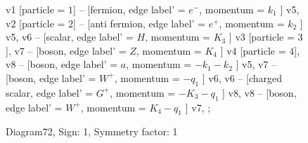 \documentclass{revtex4}
\begin{document}
\begin{figure}[!htb]
\begin{center}
{    %
v1 [particle = \(1\)] -- [fermion, edge label' = \(e^{-}\), momentum = \(k_{1}\) ] v5, 
v2 [particle = \(2\)] -- [anti fermion, edge label' = \(e^{+}\), momentum = \(k_{2}\) ] v5, 
v6 -- [scalar, edge label' = \(H\), momentum = \(K_{3}\) ] v3 [particle = \(3\)], 
v7 -- [boson, edge label' = \(Z\), momentum = \(K_{4}\) ] v4 [particle = \(4\)], 
v8 -- [boson, edge label' = \(a\), momentum = \(-k_{1} - k_{2}\) ] v5, 
v7 -- [boson, edge label' = \(W^{+}\), momentum = \(-q_{1}\) ] v6, 
v6 -- [charged scalar, edge label' = \(G^{+}\), momentum = \(-K_{3} - q_{1}\) ] v8, 
v8 -- [boson, edge label' = \(W^{+}\), momentum = \(K_{4} - q_{1}\) ] v7, 
};
\end{center}
\caption{Diagram72, Sign: 1, Symmetry factor: 1}
\end{figure}
\newpage
\end{document}
